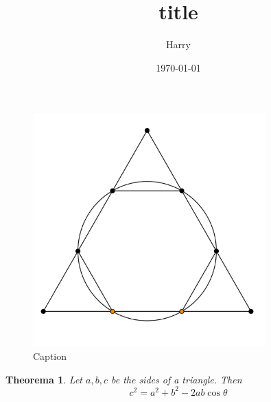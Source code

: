 \documentclass[12pt, a4paper]{article}
\title{title}
\author{Harry}
\date{\today}
\newtheorem{theorem}{Theorema}[subsection]
\theoremstyle{definition}
\theoremstyle{remark}
\begin{document}
\maketitle
\begin{figure}[htbp]
	\centering
	\includegraphics[width=0.8\textwidth]{./figure-1.png}
	\caption{Caption}
	\label{fig:Caption}
\end{figure}


\begin{theorem}
	\label{thm:1}
	Let $a, b, c$ be the sides of a triangle. Then 
	\begin{equation}
		c^2 = a^2 + b^2 - 2ab\cos\theta
	\end{equation}
\end{theorem}
\end{document}
